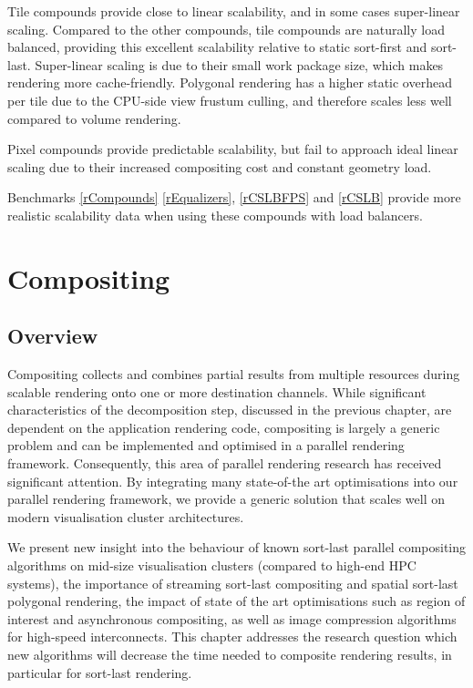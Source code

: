 Tile compounds provide close to linear scalability, and in some cases
super-linear scaling. Compared to the other compounds, tile compounds are
naturally load balanced, providing this excellent scalability relative to
static sort-first and sort-last. Super-linear scaling is due to their small
work package size, which makes rendering more cache-friendly. Polygonal
rendering has a higher static overhead per tile due to the CPU-side view
frustum culling, and therefore scales less well compared to volume rendering.

Pixel compounds provide predictable scalability, but fail to approach ideal
linear scaling due to their increased compositing cost and constant geometry
load.

Benchmarks \ref{rCompounds} \ref{rEqualizers}, \ref{rCSLBFPS} and \ref{rCSLB}
provide more realistic scalability data when using these compounds with load
balancers.

\chapter{Compositing}\label{sCompositing}

\section{Overview}

Compositing collects and combines partial results from multiple resources
during scalable rendering onto one or more destination channels. While
significant characteristics of the decomposition step, discussed in the
previous chapter, are dependent on the application rendering code, compositing
is largely a generic problem and can be implemented and optimised in a parallel
rendering framework. Consequently, this area of parallel rendering research has
received significant attention. By integrating many state-of-the art
optimisations into our parallel rendering framework, we provide a generic
solution that scales well on modern visualisation cluster architectures.

We present new insight into the behaviour of known sort-last parallel
compositing algorithms on mid-size visualisation clusters (compared to high-end
HPC systems), the importance of streaming sort-last compositing and spatial
sort-last polygonal rendering, the impact of state of the art optimisations
such as region of interest and asynchronous compositing, as well as image
compression algorithms for high-speed interconnects. This chapter addresses the
research question which new algorithms will decrease the time needed to
composite rendering results, in particular for sort-last rendering.


